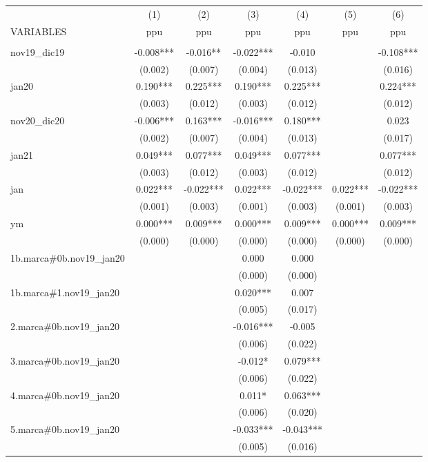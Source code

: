 \begin{tabular}{lcccccc} \hline
 & (1) & (2) & (3) & (4) & (5) & (6) \\
VARIABLES & ppu & ppu & ppu & ppu & ppu & ppu \\ \hline
 &  &  &  &  &  &  \\
nov19\_dic19 & -0.008*** & -0.016** & -0.022*** & -0.010 &  & -0.108*** \\
 & (0.002) & (0.007) & (0.004) & (0.013) &  & (0.016) \\
jan20 & 0.190*** & 0.225*** & 0.190*** & 0.225*** &  & 0.224*** \\
 & (0.003) & (0.012) & (0.003) & (0.012) &  & (0.012) \\
nov20\_dic20 & -0.006*** & 0.163*** & -0.016*** & 0.180*** &  & 0.023 \\
 & (0.002) & (0.007) & (0.004) & (0.013) &  & (0.017) \\
jan21 & 0.049*** & 0.077*** & 0.049*** & 0.077*** &  & 0.077*** \\
 & (0.003) & (0.012) & (0.003) & (0.012) &  & (0.012) \\
jan & 0.022*** & -0.022*** & 0.022*** & -0.022*** & 0.022*** & -0.022*** \\
 & (0.001) & (0.003) & (0.001) & (0.003) & (0.001) & (0.003) \\
ym & 0.000*** & 0.009*** & 0.000*** & 0.009*** & 0.000*** & 0.009*** \\
 & (0.000) & (0.000) & (0.000) & (0.000) & (0.000) & (0.000) \\
1b.marca\#0b.nov19\_jan20 &  &  & 0.000 & 0.000 &  &  \\
 &  &  & (0.000) & (0.000) &  &  \\
1b.marca\#1.nov19\_jan20 &  &  & 0.020*** & 0.007 &  &  \\
 &  &  & (0.005) & (0.017) &  &  \\
2.marca\#0b.nov19\_jan20 &  &  & -0.016*** & -0.005 &  &  \\
 &  &  & (0.006) & (0.022) &  &  \\
3.marca\#0b.nov19\_jan20 &  &  & -0.012* & 0.079*** &  &  \\
 &  &  & (0.006) & (0.022) &  &  \\
4.marca\#0b.nov19\_jan20 &  &  & 0.011* & 0.063*** &  &  \\
 &  &  & (0.006) & (0.020) &  &  \\
5.marca\#0b.nov19\_jan20 &  &  & -0.033*** & -0.043*** &  &  \\
 &  &  & (0.005) & (0.016) &  &  \\

\end{tabular}
